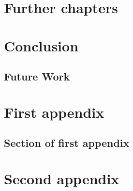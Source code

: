 \documentclass{mproj}
\begin{document}
\chapter{Further chapters}


\chapter{Conclusion}\label{conclusion}

\section{Future Work}

\appendix %
\chapter{First appendix}

\section{Section of first appendix}

\chapter{Second appendix}

\nocite{*}


\end{document}
